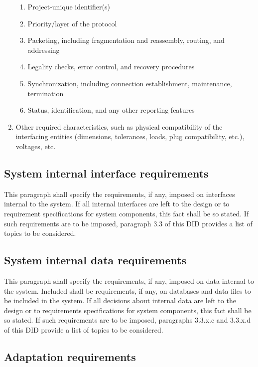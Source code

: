 \documentclass{fidata-report-template}
\begin{document}
\begin{enumerate}
  \begin{enumerate}
  \itemsep1pt\parskip0pt
  \item
    Project-unique identifier(s)
  \item
    Priority/layer of the protocol
  \item
    Packeting, including fragmentation and reassembly, routing, and
    addressing
  \item
    Legality checks, error control, and recovery procedures
  \item
    Synchronization, including connection establishment, maintenance,
    termination
  \item
    Status, identification, and any other reporting features
  \end{enumerate}
\item
  Other required characteristics, such as physical compatibility of the
  interfacing entities (dimensions, tolerances, loads, plug
  compatibility, etc.), voltages, etc.
\end{enumerate}

\subsection{System internal interface requirements}

This paragraph shall specify the requirements, if any, imposed on
interfaces internal to the system. If all internal interfaces are left
to the design or to requirement specifications for system components,
this fact shall be so stated. If such requirements are to be imposed,
paragraph 3.3 of this DID provides a list of topics to be considered.

\subsection{System internal data requirements}

This paragraph shall specify the requirements, if any, imposed on data
internal to the system. Included shall be requirements, if any, on
databases and data files to be included in the system. If all decisions
about internal data are left to the design or to requirements
specifications for system components, this fact shall be so stated. If
such requirements are to be imposed, paragraphs 3.3.x.c and 3.3.x.d of
this DID provide a list of topics to be considered.

\subsection{Adaptation requirements}
\end{document}
